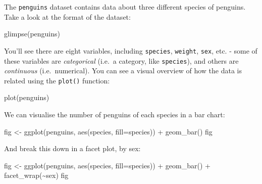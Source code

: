\documentclass[
  letterpaper,
  DIV=11,
  numbers=noendperiod]{scrreprt}
\newenvironment{Shaded}{\begin{snugshade}}{\end{snugshade}}
\newcommand{\AttributeTok}[1]{\textcolor[rgb]{0.40,0.45,0.13}{#1}}
\newcommand{\FunctionTok}[1]{\textcolor[rgb]{0.28,0.35,0.67}{#1}}
\newcommand{\NormalTok}[1]{\textcolor[rgb]{0.00,0.23,0.31}{#1}}
\newcommand{\OtherTok}[1]{\textcolor[rgb]{0.00,0.23,0.31}{#1}}
\newcommand{\SpecialCharTok}[1]{\textcolor[rgb]{0.37,0.37,0.37}{#1}}
\begin{document}
\begin{tcolorbox}[enhanced jigsaw, toptitle=1mm, bottomtitle=1mm, opacityback=0, arc=.35mm, breakable, titlerule=0mm, colback=white, colframe=quarto-callout-tip-color-frame, coltitle=black, rightrule=.15mm, title=\textcolor{quarto-callout-tip-color}{\faLightbulb}\hspace{0.5em}{Investigate Palmer's Penguins}, bottomrule=.15mm, toprule=.15mm, leftrule=.75mm, colbacktitle=quarto-callout-tip-color!10!white, opacitybacktitle=0.6, left=2mm]

The \texttt{penguins} dataset contains data about three different
species of penguins. Take a look at the format of the dataset:

\begin{Shaded}
\begin{Highlighting}[]
\FunctionTok{glimpse}\NormalTok{(penguins)}
\end{Highlighting}
\end{Shaded}

You'll see there are eight variables, including \texttt{species},
\texttt{weight}, \texttt{sex}, etc. - some of these variables are
\emph{categorical} (i.e.~a category, like \texttt{species}), and others
are \emph{continuous} (i.e.~numerical). You can see a visual overview of
how the data is related using the \texttt{plot()} function:

\begin{Shaded}
\begin{Highlighting}[]
\FunctionTok{plot}\NormalTok{(penguins)}
\end{Highlighting}
\end{Shaded}

We can visualise the number of penguins of each species in a bar chart:

\begin{Shaded}
\begin{Highlighting}[]
\NormalTok{fig }\OtherTok{\textless{}{-}} \FunctionTok{ggplot}\NormalTok{(penguins, }\FunctionTok{aes}\NormalTok{(species, }\AttributeTok{fill=}\NormalTok{species)) }\SpecialCharTok{+}
         \FunctionTok{geom\_bar}\NormalTok{()}
\NormalTok{fig}
\end{Highlighting}
\end{Shaded}

And break this down in a facet plot, by sex:

\begin{Shaded}
\begin{Highlighting}[]
\NormalTok{fig }\OtherTok{\textless{}{-}} \FunctionTok{ggplot}\NormalTok{(penguins, }\FunctionTok{aes}\NormalTok{(species, }\AttributeTok{fill=}\NormalTok{species)) }\SpecialCharTok{+}
         \FunctionTok{geom\_bar}\NormalTok{() }\SpecialCharTok{+}
         \FunctionTok{facet\_wrap}\NormalTok{(}\SpecialCharTok{\textasciitilde{}}\NormalTok{sex)}
\NormalTok{fig}
\end{Highlighting}
\end{Shaded}


\end{tcolorbox}
\end{document}

